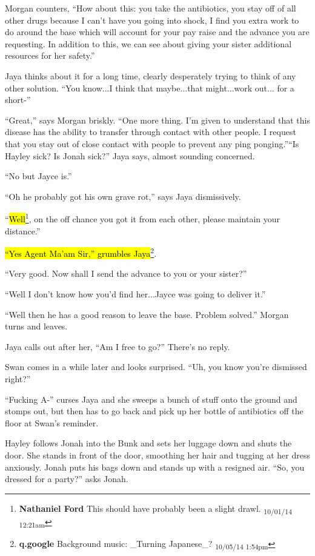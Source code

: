Morgan counters, ``How about this: you take the antibiotics, you stay off of all other drugs because I can't have you going into shock, I find you extra work to do around the base which will account for your pay raise and the advance you are requesting.  In addition to this, we can see about giving your sister additional resources for her safety.''

Jaya thinks about it for a long time, clearly desperately trying to think of any other solution.  ``You know...I think that maybe...that might...work out... for a short-''

``Great,'' says Morgan briskly.  ``One more thing.  I'm given to understand that this disease has the ability to transfer through contact with other people.  I request that you stay out of close contact with people to prevent any ping ponging.''``Is Hayley sick?  Is Jonah sick?'' Jaya says, almost sounding concerned.

``No but Jayce is.''

``Oh he probably got his own grave rot,'' says Jaya dismissively.

``\hl{Well}\footnote{\textbf{Nathaniel Ford }This should have probably been a slight drawl. \textsubscript{10/01/14 12:21am}}, on the off chance you got it from each other, please maintain your distance.''

\hl{``Yes Agent Ma'am Sir,'' grumbles Jaya}\footnote{\textbf{q.google }Background music: \_Turning Japanese\_? \textsubscript{10/05/14 1:54pm}}.

``Very good.  Now shall I send the advance to you or your sister?''

``Well I don't know how you'd find her...Jayce was going to deliver it.''

``Well then he has a good reason to leave the base.  Problem solved.'' Morgan turns and leaves.

Jaya calls out after her, ``Am I free to go?''  There's no reply.



Swan comes in a while later and looks surprised.  ``Uh, you know you're dismissed right?''

``Fucking A-'' curses Jaya and she sweeps a bunch of stuff onto the ground and stomps out, but then has to go back and pick up her bottle of antibiotics off the floor at Swan's reminder.





Hayley follows Jonah into the Bunk and sets her luggage down and shuts the door.  She stands in front of the door, smoothing her hair and tugging at her dress anxiously.  Jonah puts his bags down and stands up with a resigned air.  ``So, you dressed for a party?'' asks Jonah.

